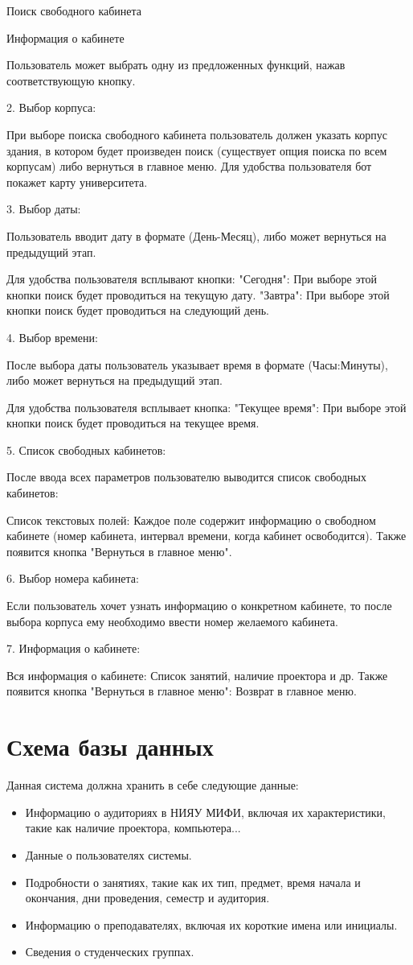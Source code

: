 Поиск свободного кабинета

Информация о кабинете

Пользователь может выбрать одну из предложенных функций, нажав соответствующую
кнопку.

2. Выбор корпуса:

При выборе поиска свободного кабинета пользователь должен указать корпус здания,
в котором будет произведен
поиск (существует опция поиска по всем корпусам) либо вернуться в главное меню.
Для удобства пользователя бот покажет карту университета.

3. Выбор даты:

Пользователь вводит дату в формате (День-Месяц), либо может вернуться на
предыдущий этап.

Для удобства пользователя всплывают кнопки:
"Сегодня": При выборе этой кнопки поиск будет проводиться на текущую дату.
"Завтра": При выборе этой кнопки поиск будет проводиться на следующий день.

4. Выбор времени:

После выбора даты пользователь указывает время в формате (Часы:Минуты), либо
может вернуться на предыдущий этап.

Для удобства пользователя всплывает кнопка:
"Текущее время": При выборе этой кнопки поиск будет проводиться на текущее
время.

5. Список свободных кабинетов:

После ввода всех параметров пользователю выводится список свободных кабинетов:

Список текстовых полей: Каждое поле содержит информацию о свободном кабинете
(номер кабинета, интервал времени, когда кабинет освободится).
Также появится кнопка "Вернуться в главное меню".

6. Выбор номера кабинета:

Если пользователь хочет узнать информацию о конкретном кабинете, то после выбора
корпуса
ему необходимо ввести номер желаемого кабинета.

7. Информация о кабинете:

Вся информация о кабинете: Список занятий, наличие проектора и др.
Также появится кнопка "Вернуться в главное меню": Возврат в главное меню.

\chapter{Схема базы данных}

Данная система должна хранить в себе следующие данные:
\begin{itemize}
    \item Информацию о аудиториях в НИЯУ МИФИ, включая их характеристики, такие
как наличие проектора, компьютера...
    \item Данные о пользователях системы.
    \item Подробности о занятиях, такие как их тип, предмет, время начала и
окончания, дни проведения, семестр и аудитория.
    \item Информацию о преподавателях, включая их короткие имена или инициалы.
    \item Сведения о студенческих группах.
\end{itemize}

